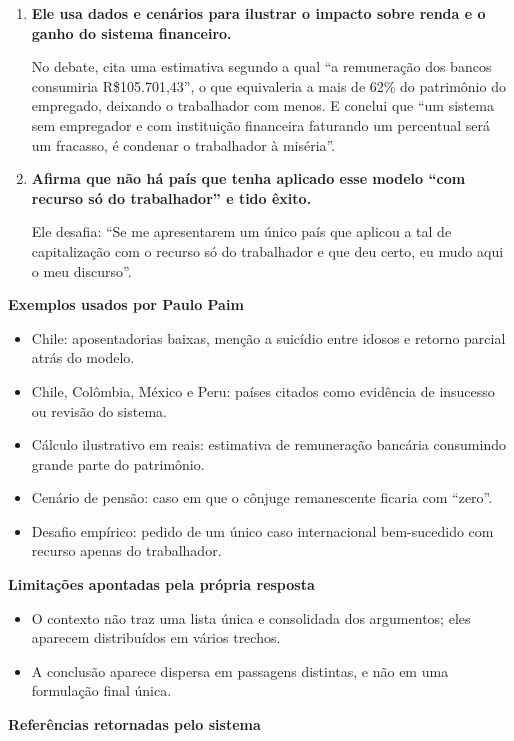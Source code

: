 \begin{enumerate}
  \item \textbf{Ele usa dados e cenários para ilustrar o impacto sobre renda e o ganho do sistema financeiro.}

  No debate, cita uma estimativa segundo a qual ``a remuneração dos bancos consumiria R\$105.701,43'', o que equivaleria a mais de 62\% do patrimônio do empregado, deixando o trabalhador com menos. E conclui que ``um sistema sem empregador e com instituição financeira faturando um percentual será um fracasso, é condenar o trabalhador à miséria''.

  \item \textbf{Afirma que não há país que tenha aplicado esse modelo ``com recurso só do trabalhador'' e tido êxito.}

  Ele desafia: ``Se me apresentarem um único país que aplicou a tal de capitalização com o recurso só do trabalhador e que deu certo, eu mudo aqui o meu discurso''.
\end{enumerate}

\textbf{Exemplos usados por Paulo Paim}

\begin{itemize}
  \item Chile: aposentadorias baixas, menção a suicídio entre idosos e retorno parcial atrás do modelo.
  \item Chile, Colômbia, México e Peru: países citados como evidência de insucesso ou revisão do sistema.
  \item Cálculo ilustrativo em reais: estimativa de remuneração bancária consumindo grande parte do patrimônio.
  \item Cenário de pensão: caso em que o cônjuge remanescente ficaria com ``zero''.
  \item Desafio empírico: pedido de um único caso internacional bem-sucedido com recurso apenas do trabalhador.
\end{itemize}

\textbf{Limitações apontadas pela própria resposta}

\begin{itemize}
  \item O contexto não traz uma lista única e consolidada dos argumentos; eles aparecem distribuídos em vários trechos.
  \item A conclusão aparece dispersa em passagens distintas, e não em uma formulação final única.
\end{itemize}

\textbf{Referências retornadas pelo sistema}


